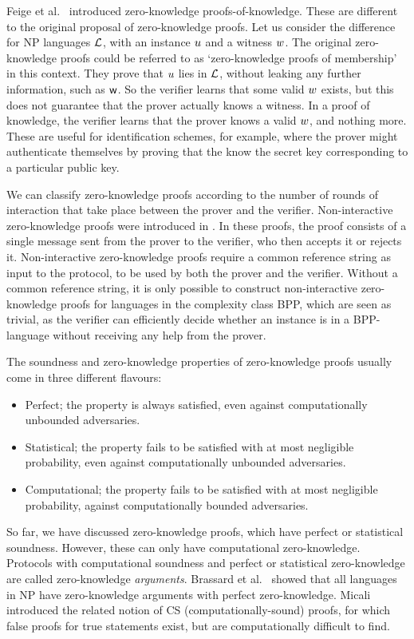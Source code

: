 Feige et al.~\cite{FeigeFS87} introduced zero-knowledge proofs-of-knowledge. These are different to the original proposal of zero-knowledge proofs. Let us consider the difference for \textsf{NP} languages $\mathcal{L}$, with an instance $u$ and a witness $w$. The original zero-knowledge proofs could be referred to as `zero-knowledge proofs of membership' in this context. They prove that $u$ lies in $\mathcal{L}$, without leaking any further information, such as $\mathsf{w}$. So the verifier learns that some valid $w$ exists, but this does not guarantee that the prover actually knows a witness. In a proof of knowledge, the verifier learns that the prover knows a valid $w$, and nothing more. These are useful for identification schemes, for example, where the prover might authenticate themselves by proving that the know the secret key corresponding to a particular public key.

We can classify zero-knowledge proofs according to the number of rounds of interaction that take place between the prover and the verifier. Non-interactive zero-knowledge proofs were introduced in \cite{BFM}. In these proofs, the proof consists of a single message sent from the prover to the verifier, who then accepts it or rejects it. Non-interactive zero-knowledge proofs require a common reference string as input to the protocol, to be used by both the prover and the verifier. Without a common reference string, it is only possible to construct non-interactive zero-knowledge proofs for languages in the complexity class \textsf{BPP}, which are seen as trivial, as the verifier can efficiently decide whether an instance is in a \textsf{BPP}-language without receiving any help from the prover.

The soundness and zero-knowledge properties of zero-knowledge proofs usually come in three different flavours:
\begin{itemize}
\item Perfect; the property is always satisfied, even against computationally unbounded adversaries.
\item Statistical; the property fails to be satisfied with at most negligible probability, even against computationally unbounded adversaries.
\item Computational; the property fails to be satisfied with at most negligible probability, against computationally bounded adversaries.
\end{itemize}
So far, we have discussed zero-knowledge proofs, which have perfect or statistical soundness. However, these can only have computational zero-knowledge. Protocols with computational soundness and perfect or statistical zero-knowledge are called zero-knowledge \emph{arguments}. Brassard et al.~\cite{BCC} showed that all languages in NP have zero-knowledge arguments with perfect zero-knowledge. Micali \cite{Mic00} introduced the related notion of CS (computationally-sound) proofs, for which false proofs for true statements exist, but are computationally difficult to find.

